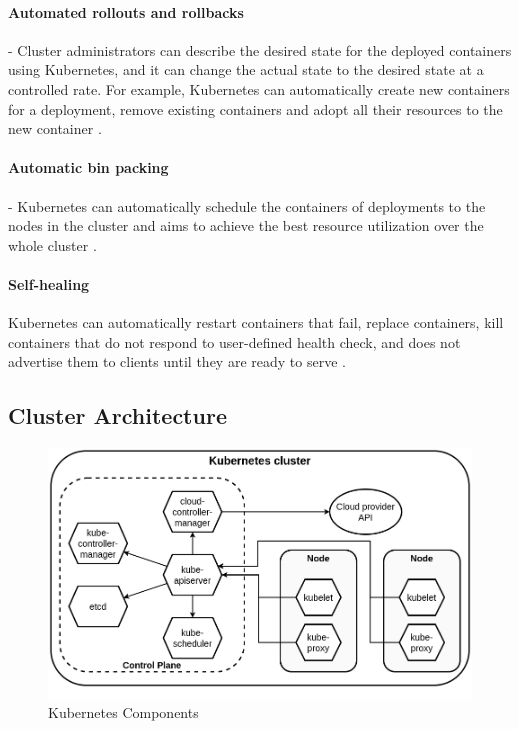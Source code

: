 \paragraph{Automated rollouts and rollbacks} - Cluster administrators can describe the desired state for the deployed containers using Kubernetes, and it can change the actual state to the desired state at a controlled rate. For example, Kubernetes can automatically create new containers for a deployment, remove existing containers and adopt all their resources to the new container \cite{KubernetesOverview}.

\paragraph{Automatic bin packing} - Kubernetes can automatically schedule the containers of deployments to the nodes in the cluster and aims to achieve the best resource utilization over the whole cluster \cite{KubernetesOverview}.

\paragraph{Self-healing} Kubernetes can automatically restart containers that fail, replace containers, kill containers that do not respond to user-defined health check, and does not advertise them to clients until they are ready to serve \cite{KubernetesOverview}.

\subsection{Cluster Architecture}

\begin{figure}[h]
	\centering
	\includegraphics[width=130mm, keepaspectratio]{figures/kubernetes_components.png}
	\caption{Kubernetes Components \cite{KubernetesArchitecture}}
	\label{fig:kubernetes_components}
\end{figure}


